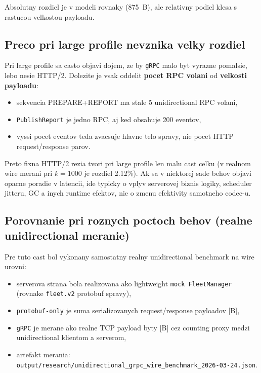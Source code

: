 \documentclass[12pt,a4paper]{report}
\begin{document}
Absolutny rozdiel je v modeli rovnaky (875~B), ale relativny podiel klesa
s rastucou velkostou payloadu.

\subsection{Preco pri large profile nevznika velky rozdiel}

Pri large profile sa casto objavi dojem, ze by \texttt{gRPC} malo byt
vyrazne pomalsie, lebo nesie HTTP/2. Dolezite je vsak oddelit
\textbf{pocet RPC volani} od \textbf{velkosti payloadu}:
\begin{itemize}
  \item sekvencia PREPARE+REPORT ma stale 5 unidirectional RPC volani,
  \item \texttt{PublishReport} je jedno RPC, aj ked obsahuje 200 eventov,
  \item vyssi pocet eventov teda zvacsuje hlavne telo spravy, nie pocet
  HTTP request/response parov.
\end{itemize}

Preto fixna HTTP/2 rezia tvori pri large profile len malu cast celku
(v realnom wire merani pri $k=1000$ je rozdiel 2.12\%).
Ak sa v niektorej sade behov objavi opacne poradie v latencii,
ide typicky o vplyv serverovej biznis logiky, scheduler jitteru,
GC a inych runtime efektov, nie o zmenu efektivity samotneho codec-u.

\subsection{Porovnanie pri roznych poctoch behov (realne unidirectional meranie)}

Pre tuto cast bol vykonany samostatny realny unidirectional benchmark na wire urovni:
\begin{itemize}
  \item serverova strana bola realizovana ako lightweight
  \texttt{mock FleetManager} (rovnake \texttt{fleet.v2} protobuf spravy),
  \item \texttt{protobuf-only} je suma serializovanych request/response payloadov [B],
  \item \texttt{gRPC} je merane ako realne TCP payload byty [B] cez counting proxy
  medzi unidirectional klientom a serverom,
  \item artefakt merania:
  \texttt{output/research/unidirectional\_grpc\_wire\_benchmark\_2026-03-24.json}.
\end{itemize}
\end{document}
